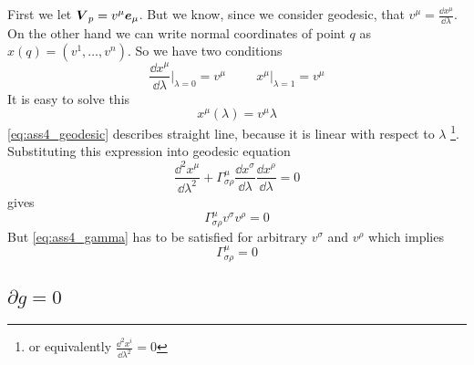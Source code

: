 First we let $\boldsymbol{V}_p=v^\mu \boldsymbol{e}_\mu$. But we know, since we consider
geodesic, that $v^\mu = \frac{\dd x^\mu}{\dd \lambda}$.  On the other hand we
can write normal coordinates of point $q$ as $x(q)=(v^1,\dots,v^n)$. So we have
two conditions
%
\begin{equation}
    \frac{\dd x^\mu}{\dd \lambda} \Big|_{\lambda=0} = v^\mu
    \hspace{1cm}
    x^\mu  \Big|_{\lambda=1}= v^\mu
\end{equation}
%
It is easy to solve this
%
\begin{equation}
    x^\mu\left(\lambda\right) = v^\mu \lambda
    \label{eq:ass4_geodesic}
\end{equation}
%
\autoref{eq:ass4_geodesic} describes straight line, because it is linear with
respect to $\lambda$ \footnote{or equivalently $\frac{\dd^2 x^i}{\dd
            \lambda^2}=0$}.
%
Substituting this expression into geodesic equation
%
\begin{equation}
    \frac{\dd^2 x^\mu}{\dd \lambda^2} +
    \Gamma_{\sigma\rho}^\mu\frac{\dd x^\sigma}{\dd \lambda}\frac{\dd x^\rho}{\dd \lambda} = 0
\end{equation}
%
gives
%
\begin{equation}
    \Gamma_{\sigma\rho}^\mu v^\sigma v^\rho = 0
    \label{eq:ass4_gamma}
\end{equation}
%
But \autoref{eq:ass4_gamma} has to be satisfied for arbitrary $v^\sigma$ and
$v^\rho$ which implies
%
\begin{equation}
    \boxed{\Gamma_{\sigma\rho}^\mu = 0}
\end{equation}
%
\problem

\subsection{\texorpdfstring{$\partial g = 0$}{TEXT}}

